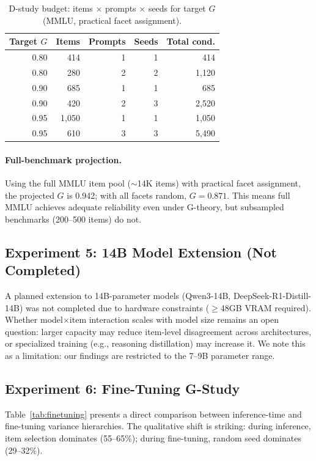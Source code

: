 \documentclass[11pt,letterpaper]{article}
\begin{document}
\begin{table}[t]
\centering
\caption{D-study budget: items $\times$ prompts $\times$ seeds for target $G$ (MMLU, practical facet assignment).}
\label{tab:dstudy_budget}
\small
\begin{tabular}{@{}rrrrr@{}}
\toprule
Target $G$ & Items & Prompts & Seeds & Total cond. \\
\midrule
0.80 & 414 & 1 & 1 & 414 \\
0.80 & 280 & 2 & 2 & 1,120 \\
0.90 & 685 & 1 & 1 & 685 \\
0.90 & 420 & 2 & 3 & 2,520 \\
0.95 & 1,050 & 1 & 1 & 1,050 \\
0.95 & 610 & 3 & 3 & 5,490 \\
\bottomrule
\end{tabular}
\end{table}

\paragraph{Full-benchmark projection.}
Using the full MMLU item pool ($\sim$14K items) with practical facet assignment, the projected $G$ is 0.942; with all facets random, $G = 0.871$.
This means full MMLU achieves adequate reliability even under G-theory, but subsampled benchmarks (200--500 items) do not.

\subsection{Experiment 5: 14B Model Extension (Not Completed)}

A planned extension to 14B-parameter models (Qwen3-14B, DeepSeek-R1-Distill-14B) was not completed due to hardware constraints ($\geq$48GB VRAM required).
Whether model$\times$item interaction scales with model size remains an open question: larger capacity may reduce item-level disagreement across architectures, or specialized training (e.g., reasoning distillation) may increase it.
We note this as a limitation: our findings are restricted to the 7--9B parameter range.

\subsection{Experiment 6: Fine-Tuning G-Study}

Table~\ref{tab:finetuning} presents a direct comparison between inference-time and fine-tuning variance hierarchies.
The qualitative shift is striking: during inference, item selection dominates (55--65\%); during fine-tuning, random seed dominates (29--32\%).
\end{document}
